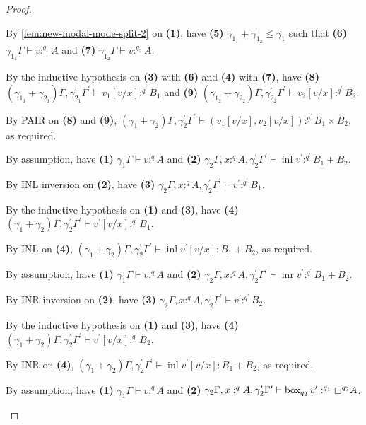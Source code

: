 \documentclass[acmsmall,screen,nonacm]{acmart}
\DeclareMathOperator{\bbox}{\text{box}}
\DeclareMathOperator{\inl}{\text{inl}}
\DeclareMathOperator{\inr}{\text{inr}}
\newcommand{\tee}{\vdash}
\begin{document}
\begin{proof}
\begin{description}
    By \ref{lem:new-modal-mode-split-2} on \textbf{(1)}, have \textbf{(5)} $\gamma_{1_1} + \gamma_{1_2} \le \gamma_1$ such that \textbf{(6)} $\gamma_{1_1}\Gamma \tee v :^{q_1} A$ and \textbf{(7)} $\gamma_{1_2}\Gamma \tee v :^{q_2} A$.

    By the inductive hypothesis on \textbf{(3)} with \textbf{(6)} and \textbf{(4)} with \textbf{(7)}, have \textbf{(8)} $(\gamma_{1_1} + \gamma_{2_1})\Gamma, \gamma_{2_1}^\prime\Gamma^\prime \tee v_1[v/x] :^{q^\prime} B_1$ and \textbf{(9)} $(\gamma_{1_2} + \gamma_{2_2})\Gamma, \gamma_{2_2}^\prime\Gamma^\prime \tee v_2[v/x] :^{q^\prime} B_2$.

    By PAIR on \textbf{(8)} and \textbf{(9)}, $(\gamma_1 + \gamma_2)\Gamma, \gamma_2^\prime\Gamma^\prime \tee (v_1[v/x], v_2[v/x]) :^{q^\prime} B_1 \times B_2$, as required.
    \\
    \item[Case INL.]
    By assumption, have \textbf{(1)} $\gamma_1\Gamma \tee v :^q A$ and \textbf{(2)} $\gamma_2\Gamma, x :^q A, \gamma_2^\prime\Gamma^\prime \tee \inl v^\prime :^{q^\prime} B_1 + B_2$.

    By INL inversion on \textbf{(2)}, have \textbf{(3)} $\gamma_2\Gamma, x :^q A, \gamma_2^\prime\Gamma^\prime \tee v^\prime :^{q^\prime} B_1$.

    By the inductive hypothesis on \textbf{(1)} and \textbf{(3)}, have \textbf{(4)} $(\gamma_1 + \gamma_2)\Gamma, \gamma_2^\prime\Gamma^\prime \tee v^\prime[v/x] :^{q^\prime} B_1$.

    By INL on \textbf{(4)}, $(\gamma_1 + \gamma_2)\Gamma, \gamma_2^\prime\Gamma^\prime \tee \inl v^\prime[v/x] : B_1 + B_2$, as required.
    \\
    \item[Case INR.]
    By assumption, have \textbf{(1)} $\gamma_1\Gamma \tee v :^q A$ and \textbf{(2)} $\gamma_2\Gamma, x :^q A, \gamma_2^\prime\Gamma^\prime \tee \inr v^\prime :^{q^\prime} B_1 + B_2$.

    By INR inversion on \textbf{(2)}, have \textbf{(3)} $\gamma_2\Gamma, x :^q A, \gamma_2^\prime\Gamma^\prime \tee v^\prime :^{q^\prime} B_2$.

    By the inductive hypothesis on \textbf{(1)} and \textbf{(3)}, have \textbf{(4)} $(\gamma_1 + \gamma_2)\Gamma, \gamma_2^\prime\Gamma^\prime \tee v^\prime[v/x] :^{q^\prime} B_2$.

    By INR on \textbf{(4)}, $(\gamma_1 + \gamma_2)\Gamma, \gamma_2^\prime\Gamma^\prime \tee \inl v^\prime[v/x] : B_1 + B_2$, as required.
    \\
    \item[Case $\boxempty$I.]
    By assumption, have \textbf{(1)} $\gamma_1\Gamma \tee v :^q A$ and \textbf{(2)} $\gamma_2\Gamma, x :^q A, \gamma_2^\prime\Gamma^\prime \tee \bbox_{q_2} v^\prime :^{q_1} \boxempty^{q_2} A$.


\end{description}
\end{proof}
\end{document}
